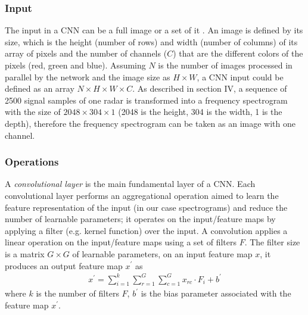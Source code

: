 \subsubsection{Input}
The input in a CNN can be a full image or a set of it \cite{bergado2018recurrent}. An image is defined by its size, which is the height (number of rows) and width (number of columns) of its array of pixels and the number of channels ($C$) that are the different colors of the pixels (red, green and blue). Assuming $N$ is the number of images processed in parallel by the network and the image size as $H\times W$, a CNN input could be defined as an array $N\times H\times W\times C$. As described in section IV, a sequence of 2500 signal samples of one radar is transformed into a frequency spectrogram with the size of $2048 \times 304 \times 1$ (2048 is the height, 304 is the width, 1 is the depth), therefore the frequency spectrogram can be taken as an image with one channel.

\subsubsection{Operations}
A \textit{convolutional layer} is the main fundamental layer of a CNN. Each convolutional layer performs an aggregational operation aimed to learn the feature representation of the input (in our case spectrograms) and reduce the number of learnable parameters; it operates on the input/feature maps by applying a filter (e.g. kernel function) over the input. A convolution applies a linear operation on the input/feature maps using a set of filters $F$. The filter size is a matrix $G\times G$ of learnable parameters, on an input feature map $x$, it produces an output feature map $x^{'}$ as
\begin{equation}
\begin{split}
x^{'}=\sum_{i=1}^{k}\sum_{r=1}^{G}\sum_{c=1}^{G}x_{rc}\cdot F_{i}+b^{'}
\end{split}
\end{equation}
where $k$ is the number of filters $F$, $b^{'}$ is the bias parameter associated with the feature map $x^{'}$.

